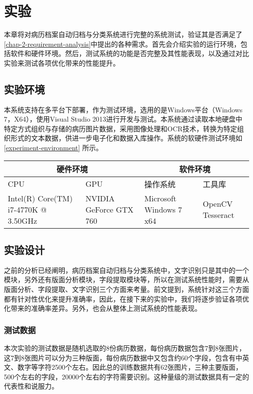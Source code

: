 \chapter{实验}
\label{chap:experiments}
本章将对病历档案自动归档与分类系统进行完整的系统测试，验证其是否满足了\autoref{chap-2-requirement-analysis}中提出的各种需求。首先会介绍实验的运行环境，包括软件和硬件环境。然后，测试系统的功能是否完整及其性能表现，以及通过对比实验来测试各项优化带来的性能提升。
\section{实验环境}
本系统支持在多平台下部署，作为测试环境，选用的是Windows平台（Windows 7，X64），使用Visual Studio 2013进行开发与测试。本系统通过读取本地硬盘中特定方式组织与存储的病历图片数据，采用图像处理和OCR技术，转换为特定组织形式的文本数据，供进一步电子化和数据入库操作。系统的软硬件测试环境如\autoref{experiment-environment} 所示。
\begin{table}[!htbp]
	\label{experiment-environment}
	\centering
	\vspace{10pt}
  \renewcommand\arraystretch{1.5}  %
	\begin{tabular}{p{3cm}|p{3cm}|p{3cm}|p{3cm}}
    \hline
    \multicolumn{2}{c|}{硬件环境} & \multicolumn{2}{c}{软件环境} \\
		\hline
    CPU&GPU&操作系统&工具库 \\
		\hline
    Intel(R) Core(TM)  i7-4770K @ 3.50GHz & NVIDIA GeForce  GTX 760 & Microsoft  Windows 7 x64 & OpenCV  Tesseract \\
    \hline
	\end{tabular}
\end{table}

\section{实验设计}
\label{sec:experiment-design}
之前的分析已经阐明，病历档案自动归档与分类系统中，文字识别只是其中的一个模块，另外还有版面分析模块，字段提取模块等，所以在测试系统性能时，需要从版面分析、字段提取、文字识别三个方面来考量。前文提到，系统针对这三个方面都有针对性优化来提升准确率，因此，在接下来的实验中，我们将逐步验证各项优化带来的准确率差异。另外，也会从整体上测试系统的性能表现。
\subsection*{测试数据}
本次实验的测试数据是随机选取的8份病历数据，每份病历数据包含7到8张图片，这7到8张图片可以分为三种版面，每份病历数据中又包含约60个字段，包含有中英文、数字等字符2500个左右。因此总的训练数据共有62张图片，三种主要版面，500个左右的字段，20000个左右的字符需要识别。这种量级的测试数据具有一定的代表性和说服力。
